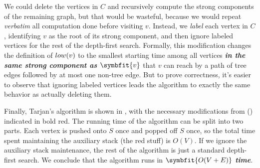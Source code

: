 We could delete the vertices in $C$ and recursively compute the strong components of the remaining graph, but that would be wasteful, because we would repeat \textit{verbatim} all computation done before visiting $v$.
Instead, we \textit{label} each vertex in $C$, identifying $v$ as the root of its strong component, and then ignore labeled vertices for the rest of the depth-first search.
Formally, this modification changes the definition of $low(v)$ to the smallest starting time among all vertices \textbf{\textit{in the same strong component as $\symbfit{v}$}} that $v$ can reach by a path of tree edges followed by at most one non-tree edge.
But to prove correctness, it’s easier to observe that ignoring labeled vertices leads the algorithm to exactly the same behavior as actually deleting them.

Finally, Tarjan’s algorithm is shown in , with the necessary modifications from  () indicated in bold red.
The running time of the algorithm can be split into two parts.
Each vertex is pushed onto $S$ once and popped off $S$ once, so the total time spent maintaining the auxiliary stack (the red stuff) is $O(V)$.
If we ignore the auxiliary stack maintenance, the rest of the algorithm is just a standard depth-first search.
We conclude that the algorithm runs in $\symbfit{O(V+E)}$ \textbf{\textit{time}}.

